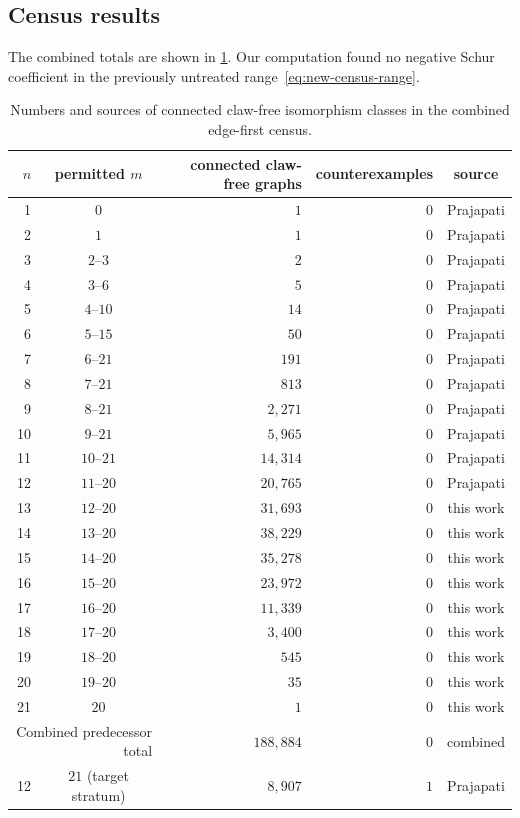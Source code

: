 \documentclass[11pt]{amsart}
\numberwithin{equation}{section}
\theoremstyle{remark}
\begin{document}
\subsection{Census results}\label{subsec:census-results}

The combined totals are shown in \cref{tab:edge-first-census}.  Our
computation found no negative Schur coefficient in the previously untreated
range~\cref{eq:new-census-range}.

\begin{table}[ht]
\centering
\small
\begin{tabular}{rcrrc}
\toprule
$n$ & permitted $m$ & connected claw-free graphs & counterexamples & source\\
\midrule
1  & $0$       & $1$      & $0$ & Prajapati\\
2  & $1$       & $1$      & $0$ & Prajapati\\
3  & $2$--$3$    & $2$      & $0$ & Prajapati\\
4  & $3$--$6$    & $5$      & $0$ & Prajapati\\
5  & $4$--$10$   & $14$     & $0$ & Prajapati\\
6  & $5$--$15$   & $50$     & $0$ & Prajapati\\
7  & $6$--$21$   & $191$    & $0$ & Prajapati\\
8  & $7$--$21$   & $813$    & $0$ & Prajapati\\
9  & $8$--$21$   & $2{,}271$  & $0$ & Prajapati\\
10 & $9$--$21$  & $5{,}965$  & $0$ & Prajapati\\
11 & $10$--$21$  & $14{,}314$ & $0$ & Prajapati\\
12 & $11$--$20$  & $20{,}765$ & $0$ & Prajapati\\
13 & $12$--$20$  & $31{,}693$ & $0$ & this work\\
14 & $13$--$20$  & $38{,}229$ & $0$ & this work\\
15 & $14$--$20$  & $35{,}278$ & $0$ & this work\\
16 & $15$--$20$  & $23{,}972$ & $0$ & this work\\
17 & $16$--$20$  & $11{,}339$ & $0$ & this work\\
18 & $17$--$20$  & $3{,}400$  & $0$ & this work\\
19 & $18$--$20$  & $545$    & $0$ & this work\\
20 & $19$--$20$  & $35$     & $0$ & this work\\
21 & $20$      & $1$      & $0$ & this work\\
\midrule
\multicolumn{2}{r}{Combined predecessor total}
& $188{,}884$ & $0$ & combined\\
\midrule
12 & $21$ (target stratum) & $8{,}907$ & $1$ & Prajapati\\
\bottomrule
\end{tabular}
\caption{Numbers and sources of connected claw-free isomorphism classes in
the combined edge-first census.}
\label{tab:edge-first-census}
\end{table}
\end{document}
